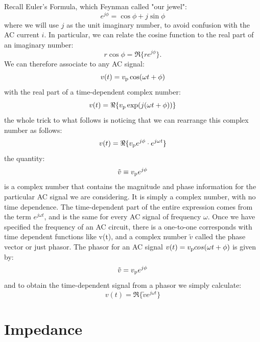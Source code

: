 \documentclass[12pt,oneside]{book}
\begin{document}
Recall Euler's Formula, which Feynman called "our jewel":
\begin{displaymath}
e^{j\phi} = \cos \phi + j \sin \phi 
\end{displaymath}
where we will use $j$ as the unit imaginary number, to avoid confusion with the AC current $i$.  In particular, we can relate the cosine function to the real part of an imaginary number:
\begin{displaymath}
r \cos \phi = \Re \{ r e^{j\phi} \}. 
\end{displaymath}
We can therefore associate to any AC signal:
\begin{displaymath}
v(t) = v_{\rm p} \cos ( \omega t + \phi)
\end{displaymath}
with the real part of a time-dependent complex number:
\begin{displaymath}
v(t) = \Re \{ v_{\rm p} \exp ( j (\omega t + \phi))\}
\end{displaymath}
the whole trick to what follows is noticing that we can rearrange this complex number as follows:
\begin{displaymath}
v(t) = \Re \{ v_{\rm p} e^{j\phi} \cdot e^{j \omega t} \}
\end{displaymath}
the quantity:
\begin{displaymath}
\tilde{v} \equiv v_{\rm p} e^{j\phi}  
\end{displaymath}
is a complex number that contains the magnitude and phase information for the particular AC signal we are considering.  It is simply a complex number, with no time dependence.  The time-dependent part of the entire expression comes from the term $e^{j \omega t}$, and is the same for every AC signal of frequency $\omega$.  Once we have specified the frequency of an AC circuit, there is a one-to-one corresponds with time dependent functions like v(t), and a complex number $\tilde{v}$ called the phase vector or just phasor.
The phasor for an AC signal $v(t) = v_{\rm p} cos(\omega t + \phi)$ is given by:
\begin{equation}
\tilde{v} = v_{\rm p} e^{j \phi}
\end{equation}
and to obtain the time-dependent signal from a phasor we simply calculate:
\begin{equation}
v(t) = \Re \{ \tilde{v} e^{j \omega t} \}
\end{equation}


\section{Impedance}
\end{document}
